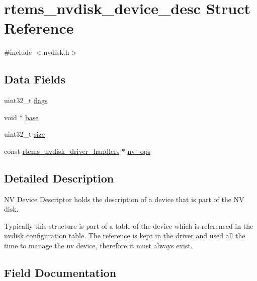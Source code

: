 \hypertarget{structrtems__nvdisk__device__desc}{}\section{rtems\+\_\+nvdisk\+\_\+device\+\_\+desc Struct Reference}
\label{structrtems__nvdisk__device__desc}


{\ttfamily \#include $<$nvdisk.\+h$>$}

\subsection*{Data Fields}
\begin{DoxyCompactItemize}
\item 
uint32\+\_\+t \mbox{\hyperlink{structrtems__nvdisk__device__desc_a920eb7a82dee701f6283a0a24689d86b}{flags}}
\item 
void $\ast$ \mbox{\hyperlink{structrtems__nvdisk__device__desc_a9539df08a97001ff8e181d092ce9348f}{base}}
\item 
uint32\+\_\+t \mbox{\hyperlink{structrtems__nvdisk__device__desc_a8320a2ce7d05b6b158d303a6f0512908}{size}}
\item 
const \mbox{\hyperlink{structrtems__nvdisk__driver__handlers}{rtems\+\_\+nvdisk\+\_\+driver\+\_\+handlers}} $\ast$ \mbox{\hyperlink{structrtems__nvdisk__device__desc_a7ebc4cd3f29ac89044d48be30f3a8df8}{nv\+\_\+ops}}
\end{DoxyCompactItemize}


\subsection{Detailed Description}
NV Device Descriptor holds the description of a device that is part of the NV disk.

Typically this structure is part of a table of the device which is referenced in the nvdisk configuration table. The reference is kept in the driver and used all the time to manage the nv device, therefore it must always exist. 

\subsection{Field Documentation}
\mbox{\label{structrtems__nvdisk__device__desc_a9539df08a97001ff8e181d092ce9348f}} 
